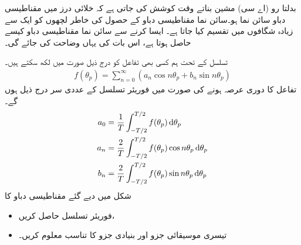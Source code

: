 بدلتا رو (اے سی) مشین بناتے وقت  کوشش کی جاتی ہے کہ خلائی درز میں مقناطیسی دباو سائن نما ہو۔سائن نما مقناطیسی دباو کے حصول  کی خاطر لچھوں کو ایک سے زیادہ شگافوں میں تقسیم کیا جاتا ہے۔ ایسا کرنے سے سائن نما مقناطیسی دباو کیسے حاصل ہوتا ہے، اس بات کی  یہاں وضاحت کی جائے گی۔

 تسلسل کے تحت ہم کسی بھی تفاعل   کو درج ذیل صورت میں لکھ سکتے ہیں۔
\begin{align}
f(\theta_p)=\sum_{n=0}^{\infty} (a_n \cos n \theta_p +b_n \sin n \theta_p)
\end{align}
تفاعل کا دوری عرصہ  ہونے کی صورت میں فوریئر تسلسل کے عددی سر درج ذیل ہوں گے۔
\begin{gather}
\begin{aligned}\label{مساوات_گھومتے_مشین_فورئر_تسلسل_جزو}
a_0&=\frac{1}{T} \int_{-T/2}^{T/2} f(\theta_p) \dif \theta_p\\
a_n&=\frac{2}{T} \int_{-T/2}^{T/2} f(\theta_p) \cos n \theta_p \dif \theta_p\\
b_n&=\frac{2}{T} \int_{-T/2}^{T/2} f(\theta_p) \sin n \theta_p \dif \theta_p
\end{aligned}
\end{gather}
%
شکل   میں دیے گئے مقناطیسی دباو کا
\begin{itemize}
\item
فوریئر تسلسل حاصل کریں،
\item
تیسری موسیقائی جزو اور بنیادی جزو کا تناسب معلوم کریں۔
\end{itemize}

